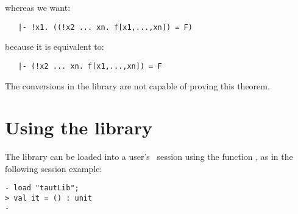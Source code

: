 \noindent
whereas we want:

\begin{boxed}\begin{verbatim}
   |- !x1. ((!x2 ... xn. f[x1,...,xn]) = F)
\end{verbatim}\end{boxed}

\noindent
because it is equivalent to:

\begin{boxed}\begin{verbatim}
   |- (!x2 ... xn. f[x1,...,xn]) = F
\end{verbatim}\end{boxed}

\noindent
The conversions in the  library are not capable of proving this
theorem.


\section{Using the library}

The  library can be loaded into a user's \HOL\ session using the
function , as in the following session example:

\setcounter{sessioncount}{1}
\begin{session}\begin{verbatim}
- load "tautLib";
> val it = () : unit
-
\end{verbatim}\end{session}

